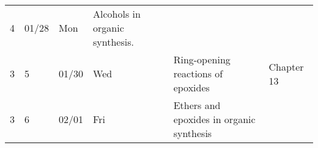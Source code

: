 \begin{longtable}[]{@{}llllll@{}}
\begin{minipage}[t]{0.03\columnwidth}
4\strut
\end{minipage} & \begin{minipage}[t]{0.06\columnwidth}\raggedright
01/28\strut
\end{minipage} & \begin{minipage}[t]{0.04\columnwidth}\raggedright
Mon\strut
\end{minipage} & \begin{minipage}[t]{0.49\columnwidth}\raggedright
Alcohols in organic synthesis.\strut
\end{minipage} & \begin{minipage}[t]{0.17\columnwidth}\raggedright
\strut
\end{minipage}\tabularnewline
\begin{minipage}[t]{0.03\columnwidth}\raggedright
3\strut
\end{minipage} & \begin{minipage}[t]{0.03\columnwidth}\raggedright
5\strut
\end{minipage} & \begin{minipage}[t]{0.06\columnwidth}\raggedright
01/30\strut
\end{minipage} & \begin{minipage}[t]{0.04\columnwidth}\raggedright
Wed\strut
\end{minipage} & \begin{minipage}[t]{0.49\columnwidth}\raggedright
Ring-opening reactions of epoxides\strut
\end{minipage} & \begin{minipage}[t]{0.17\columnwidth}\raggedright
Chapter 13\strut
\end{minipage}\tabularnewline
\begin{minipage}[t]{0.03\columnwidth}\raggedright
3\strut
\end{minipage} & \begin{minipage}[t]{0.03\columnwidth}\raggedright
6\strut
\end{minipage} & \begin{minipage}[t]{0.06\columnwidth}\raggedright
02/01\strut
\end{minipage} & \begin{minipage}[t]{0.04\columnwidth}\raggedright
Fri\strut
\end{minipage} & \begin{minipage}[t]{0.49\columnwidth}\raggedright
Ethers and epoxides in organic synthesis\strut
\end{minipage} & \begin{minipage}[t]{0.17\columnwidth}\raggedright

\end{minipage}
\end{longtable}
